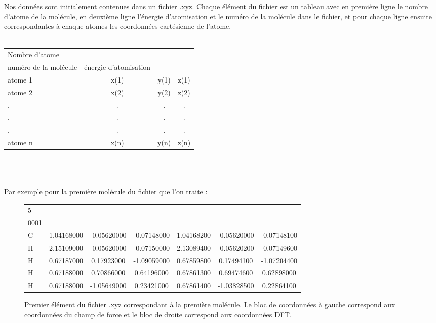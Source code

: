 \documentclass[a4paper,12pt,titlepage]{report}
\begin{document}
Nos données sont initialement contenues dans un fichier .xyz.
Chaque élément du fichier est un tableau avec en première ligne le nombre d'atome de la molécule, en deuxième ligne l'énergie d'atomisation et le numéro de la molécule dans le fichier, et pour chaque ligne ensuite correspondantes à chaque atomes les coordonnées cartésienne de l'atome.\\
\\
\begin{tabular}{ l c c c }
   Nombre d'atome &  & & \quad\\
   numéro de la molécule &\quad énergie d'atomisation &\quad &\\
   atome 1 & x(1) & y(1) & \quad z(1) \\
   atome 2 & x(2) & y(2) & \quad z(2) \\
   . & . & . & \quad . \\
   . & . & . & \quad . \\
   . & . & . & \quad . \\
   atome n & x(n) & y(n) &\quad  z(n) \\
 \end{tabular}
 \\
 \\
 \\
 Par exemple pour la première  molécule du fichier que l'on traite :
\begin{figure}[!h]
\begin{tabular}{ l c c c c c c}
   5 &  & & \quad\\
   0001 &\quad -417.031 & & & & & \\
   C & 1.04168000 & -0.05620000 & -0.07148000 & 1.04168200 & -0.05620000 & -0.07148100\\
   H  & 2.15109000 & -0.05620000 & -0.07150000 & 2.13089400 & -0.05620200 & -0.07149600\\
   H  & 0.67187000 & 0.17923000 & -1.09059000  &  0.67859800 &  0.17494100 & -1.07204400\\
   H & 0.67188000 & 0.70866000 & 0.64196000 & 0.67861300 &  0.69474600  & 0.62898000\\
   H & 0.67188000 & -1.05649000 & 0.23421000 & 0.67861400 & -1.03828500  &0.22864100\\
 \end{tabular}
 \caption{Premier élément du fichier .xyz correspondant à la première molécule. Le bloc de coordonnées à gauche correspond aux coordonnées du champ de force et le bloc de droite correspond aux coordonnées DFT.}
 \end{figure}
 
\end{document}
